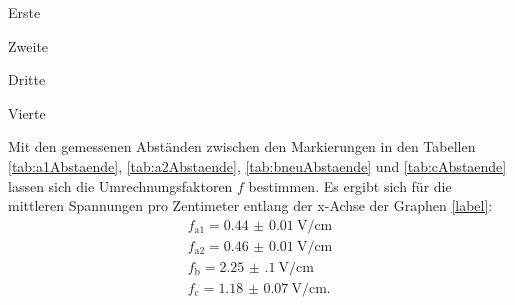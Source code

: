\begin{center}
	\begin{table}
		\begin{minipage}[t]{0.5\textwidth}
			\caption{Erste}
			\centering
			
		\end{minipage}
		\begin{minipage}[t]{0.5\textwidth}
			\caption{Zweite}
			\centering
			
		\end{minipage}
	\end{table}
\end{center}
\begin{center}
	\begin{table}
		\begin{minipage}[t]{0.5\textwidth}
			\caption{Dritte}
			\centering
			
		\end{minipage}
		\begin{minipage}[t]{0.5\textwidth}
			\caption{Vierte}
			\centering
			
		\end{minipage}
	\end{table}
\end{center}
Mit den gemessenen Abständen zwischen den Markierungen in den Tabellen \ref{tab:a1Abstaende}, \ref{tab:a2Abstaende}, \ref{tab:bneuAbstaende} und \ref{tab:cAbstaende} lassen sich die Umrechnungsfaktoren $f$ bestimmen.
Es ergibt sich für die mittleren Spannungen pro Zentimeter entlang der x-Achse der Graphen \ref{label}:
\begin{gather*}
	f_\text{a1}=\SI{0.44(1)}{\volt\per\centi\meter}\\
	f_\text{a2}=\SI{0.46(1)}{\volt\per\centi\meter}\\
	f_\text{b}=\SI{2.25(10)}{\volt\per\centi\meter}\\
	f_\text{c}=\SI{1.18(7)}{\volt\per\centi\meter}\text{.}
\end{gather*}


